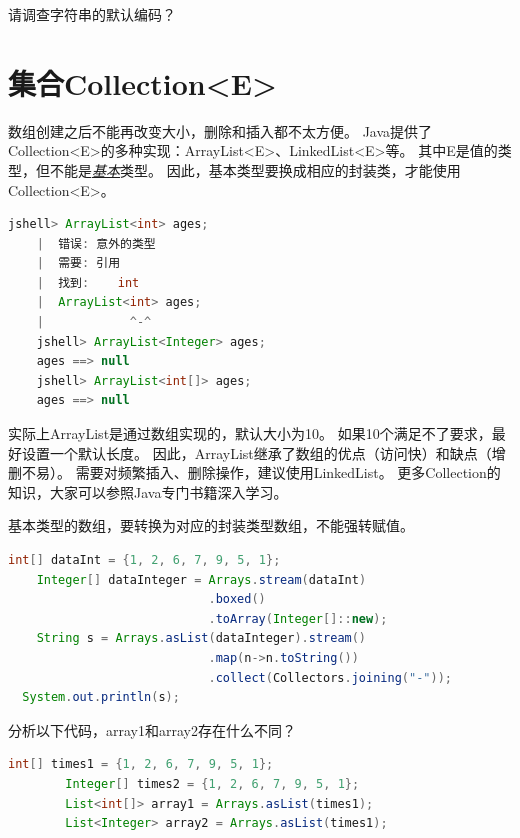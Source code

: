 \begin{exercise}
	请调查字符串的默认编码？
\end{exercise}

\section{集合Collection<E>}
数组创建之后不能再改变大小，删除和插入都不太方便。
Java提供了Collection<E>的多种实现：ArrayList<E>、LinkedList<E>等。
其中E是值的类型，但不能是\underline{\emph{基本}}类型。
因此，基本类型要换成相应的封装类，才能使用Collection<E>。

\begin{lstlisting}[language=Java, backgroundcolor=\color{lightgray!10}]
	jshell> ArrayList<int> ages;
	|  错误: 意外的类型
	|  需要: 引用
	|  找到:    int
	|  ArrayList<int> ages;
	|            ^-^
	jshell> ArrayList<Integer> ages;
	ages ==> null
	jshell> ArrayList<int[]> ages;
	ages ==> null	
\end{lstlisting}

\bigskip

实际上ArrayList是通过数组实现的，默认大小为10。
如果10个满足不了要求，最好设置一个默认长度。
因此，ArrayList继承了数组的优点（访问快）和缺点（增删不易）。
需要对频繁插入、删除操作，建议使用LinkedList。
更多Collection的知识，大家可以参照Java专门书籍深入学习。
\bigskip

\begin{example}
	基本类型的数组，要转换为对应的封装类型数组，不能强转赋值。
\end{example}
\begin{lstlisting}[language=Java]
	int[] dataInt = {1, 2, 6, 7, 9, 5, 1};
	Integer[] dataInteger = Arrays.stream(dataInt)
							.boxed()
							.toArray(Integer[]::new);
	String s = Arrays.asList(dataInteger).stream()
							.map(n->n.toString())
							.collect(Collectors.joining("-"));
  System.out.println(s);
\end{lstlisting}

\bigskip

\begin{exercise}
	分析以下代码，array1和array2存在什么不同？
	\begin{lstlisting}[language=Java]
		int[] times1 = {1, 2, 6, 7, 9, 5, 1};
		Integer[] times2 = {1, 2, 6, 7, 9, 5, 1};
		List<int[]> array1 = Arrays.asList(times1);
		List<Integer> array2 = Arrays.asList(times1);
	\end{lstlisting}
\end{exercise}

